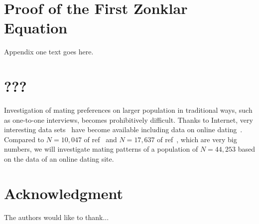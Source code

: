 \documentclass[journal,comsoc]{IEEEtran}
\newcommand{\hbIdea}[1]{{\color{red}{\scriptsize [{#1}]}}}
\newcommand{\refcite}[1]{ref~\cite{#1}}
\begin{document}
%


\appendices
\section{Proof of the First Zonklar Equation}
Appendix one text goes here.

\section{???}

\hbIdea{large data} %
Investigation of mating preferences
on larger population in traditional ways,
such as one-to-one interviews, 
becomes prohibitively difficult.
Thanks to Internet,
very interesting data sets~\cite{
	Centola2010Science, 
	Rocha2010PNAS,
	Szell2010PNAS,
	Szell2013SR,
	Kramer2014PNAS} 
have become available including
data on online dating~\cite{
	Barraket2008JSociology,
	Bingol2012PartnerArxiv,
	Norcie2013LNCS,
	Zhao2014IS,
	Ellison2013}.
Compared to 
$N = 10,047$ 
of \refcite{Buss1989} 
and
$N = 17,637$ of \refcite{Schmitt2008},
which are very big numbers,
we will investigate mating patterns of a population of 
$N = 44,253$
based on
the data of an online dating site. 


\section*{Acknowledgment}


The authors would like to thank...


\ifCLASSOPTIONcaptionsoff
  \newpage
\fi
\end{document}
